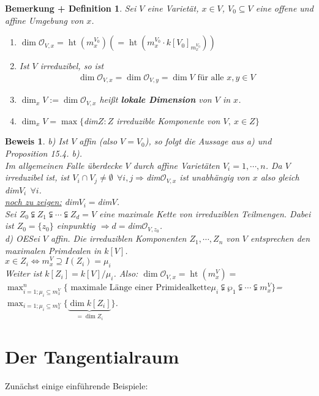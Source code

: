 \documentclass[a4paper,12pt]{report}
\theoremstyle{break}
\newtheorem{BemDef}[Def]{Bemerkung + Definition}
\theoremstyle{nonumberbreak}
\theoremstyle{nonumberplain}
\newtheorem{Bew}{Beweis}
\newcommand{\emp}[1]{\textbf{\emph{#1}}}
\newcommand{\begriff}[1]{{\index{#1}}\emp{#1}}
\DeclareMathOperator{\height}{ht}
\renewcommand{\OE}{O\!\!E}
\begin{document}
\begin{BemDef}
  \label{bemdef:15.5}
  Sei $V$ eine Varietät, $x\in V$, $V_0\subseteq V$ eine offene und affine Umgebung von $x$.
  \begin{enumerate}
  \item $\dim\mathcal{O}_{V,x}=\height(m_x^{V_0}) (=\height(m_x^{V_0}\cdot k[V_0]_{m_x^{V_0}}))$
  \item Ist $V$ irreduzibel, so ist 
    \begin{align*}
      \dim\mathcal{O}_{V,x}=\dim\mathcal{O}_{V,y}=\dim V\text{ für alle } x,y \in V
    \end{align*}
\item $\dim_xV:=\dim\mathcal{O}_{V,x}$ heißt \begriff{lokale Dimension} von $V$ in $x$.
\item $\dim_xV=\max\{$dim$Z: Z$ irreduzible Komponente von $V,~x\in Z\}$
\end{enumerate}
\end{BemDef}

\begin{Bew}
b) Ist $V$ affin (also $V=V_0$), so folgt die Aussage aus a) und Proposition 15.4. b).\\
Im allgemeinen Falle überdecke $V$ durch affine Varietäten $V_i=1,\cdots ,n$. Da $V$ irreduzibel ist, ist $V_i\cap V_j\neq \emptyset~~\forall i,j\Rightarrow $dim$\mathcal{O}_{V,x}$ ist unabhängig von $x$ also gleich dim$V_i~~\forall i$.\\
\underline{noch zu zeigen:} dim$V_i=$dim$V$.\\
Sei $Z_0\subsetneqq Z_1\subsetneqq\cdots\subsetneqq Z_d=V$ eine maximale Kette von irreduziblen Teilmengen. Dabei ist $Z_0=\{z_0\}$ einpunktig $\Rightarrow d=$dim$\mathcal{O}_{V,z_0}$.\\
d) \OE Sei $V$ affin. Die irreduziblen Komponenten $Z_1,\cdots,Z_n$ von $V$ entsprechen den maximalen Primdealen in $k[V]$.\\
$x\in Z_i\Leftrightarrow m_x^V\supseteq I(Z_i)=\mu_i$\\
Weiter ist $k[Z_i]=k[V]/\mu_i$.
Also: $\dim\mathcal{O}_{V,x}=\height(m_x^V)=$\\
$\max_{i=1; \mu_i\subseteq m_x^V}^n\{\text{ maximale Länge einer Primidealkette} \mu_i\subsetneqq \wp_1\subsetneqq\cdots\subsetneqq m_x^V\}$=\\
$\max_{i=1; \mu_i\subseteq m_x^V}\{\underbrace{\dim k[Z_i]}_{= \dim Z_i}\}$.
\end{Bew}
\section{Der Tangentialraum}
Zunächst einige einführende Beispiele:
\end{document}
